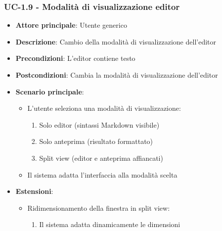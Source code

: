 \documentclass[11pt,a4paper]{article}
\begin{document}
\subsubsection{UC-1.9 - Modalità di visualizzazione editor}
\begin{itemize}
    \item \textbf{Attore principale}: Utente generico
    \item \textbf{Descrizione}: Cambio della modalità di visualizzazione dell'editor
    \item \textbf{Precondizioni}: L'editor contiene testo
    \item \textbf{Postcondizioni}: Cambia la modalità di visualizzazione dell'editor
    \item \textbf{Scenario principale}:
        \begin{itemize}
            \item L'utente seleziona una modalità di visualizzazione:
                \begin{enumerate}
                    \item Solo editor (sintassi Markdown visibile)
                    \item Solo anteprima (risultato formattato)
                    \item Split view (editor e anteprima affiancati)
                \end{enumerate}
            \item Il sistema adatta l'interfaccia alla modalità scelta
        \end{itemize}
    \item \textbf{Estensioni}:
        \begin{itemize}
            \item Ridimensionamento della finestra in split view:
                \begin{enumerate}
                    \item Il sistema adatta dinamicamente le dimensioni
                \end{enumerate}
        \end{itemize}
\end{itemize}
\end{document}
